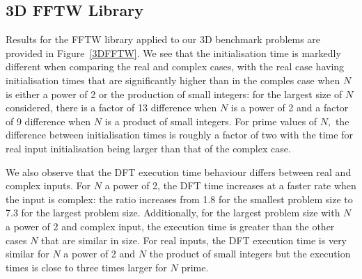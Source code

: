 \documentclass[12pt, a4paper]{article} \setlength{\textheight}{24cm}
\begin{document}
\subsection{3D FFTW Library}
Results for the FFTW library applied to our 3D benchmark problems are
provided in Figure~\ref{3DFFTW}. We see that the initialisation time
is markedly different when comparing the real and complex cases, with
the real case having initialisation times that are significantly
higher than in the comples case when $N$ is either a power of 2 or the
production of small integers: for the largest size of $N$ considered,
there is a factor of 13 difference when $N$ is a power of 2 and a
factor of 9 difference when $N$ is a product of small integers. For
prime values of $N,$ the difference between initialisation times is
roughly a factor of two with the time for real input initialisation
being larger than that of the complex case.

We also observe that the DFT execution time behaviour differs between
real and complex inputs. For $N$ a power of 2, the DFT time increases
at a faster rate when the input is complex: the ratio increases from
1.8 for the smallest problem size to 7.3 for the largest problem size.
Additionally, for the largest problem size with $N$ a power of 2 and
complex input, the execution time is greater than the other cases $N$
that are similar in size. For real inputs, the DFT execution time is
very similar for $N$ a power of 2 and $N$ the product of small
integers but the execution times is close to three times larger for
$N$ prime.
\end{document}
